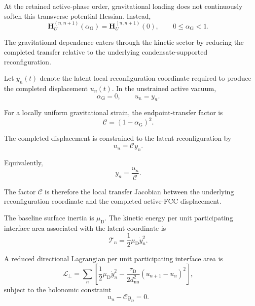 At the retained active-phase order, gravitational loading does not continuously soften this transverse potential Hessian. Instead,
\begin{equation}
    \mathbf{H}_U^{(n,n+1)}(\alpha_{\mathrm{G}}) = \mathbf{H}_U^{(n,n+1)}(0), \qquad 0 \leq \alpha_{\mathrm{G}} < 1.
\end{equation}

The gravitational dependence enters through the kinetic sector by reducing the completed transfer relative to the underlying condensate-supported reconfiguration.

Let $y_n(t)$ denote the latent local reconfiguration coordinate required to produce the completed displacement $u_n(t)$. In the unstrained active vacuum,
\begin{equation}
    \alpha_{\mathrm{G}} = 0, \qquad u_n = y_n.
\end{equation}

For a locally uniform gravitational strain, the endpoint-transfer factor is
\begin{equation}
    \mathcal{C} = (1-\alpha_{\mathrm{G}})^2.
\end{equation}

The completed displacement is constrained to the latent reconfiguration by
\begin{equation}
    u_n = \mathcal{C} y_n.
\end{equation}

Equivalently,
\begin{equation}
    y_n = \frac{u_n}{\mathcal{C}}.
\end{equation}

The factor $\mathcal{C}$ is therefore the local transfer Jacobian between the underlying reconfiguration coordinate and the completed active-FCC displacement.

The baseline surface inertia is $\mu_{\mathrm{D}}$. The kinetic energy per unit participating interface area associated with the latent coordinate is
\begin{equation}
    \mathcal{T}_n = \frac{1}{2}\mu_{\mathrm{D}}\dot{y}_n^2.
\end{equation}

A reduced directional Lagrangian per unit participating interface area is
\begin{equation}
    \mathscr{L}_\perp = \sum_n \left[ \frac{1}{2}\mu_{\mathrm{D}}\dot{y}_n^2 - \frac{\tau_{\mathrm{D}}}{2d_{\mathrm{nn}}^2} \left(u_{n+1}-u_n\right)^2 \right],
\end{equation}
subject to the holonomic constraint
\begin{equation}
    u_n - \mathcal{C} y_n = 0.
\end{equation}

